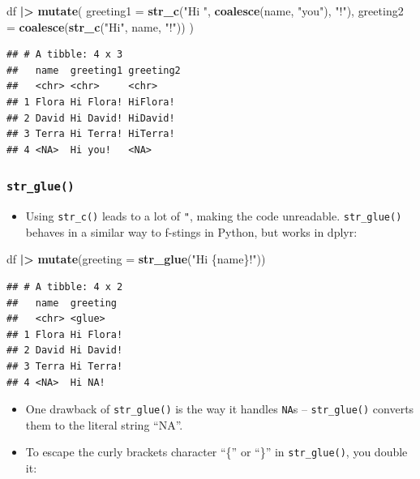 \documentclass[
]{article}
\newenvironment{Shaded}{\begin{snugshade}}{\end{snugshade}}
\newcommand{\AttributeTok}[1]{\textcolor[rgb]{0.13,0.29,0.53}{#1}}
\newcommand{\FunctionTok}[1]{\textcolor[rgb]{0.13,0.29,0.53}{\textbf{#1}}}
\newcommand{\NormalTok}[1]{#1}
\newcommand{\SpecialCharTok}[1]{\textcolor[rgb]{0.81,0.36,0.00}{\textbf{#1}}}
\newcommand{\StringTok}[1]{\textcolor[rgb]{0.31,0.60,0.02}{#1}}
\providecommand{\tightlist}{%
  \setlength{\itemsep}{0pt}\setlength{\parskip}{0pt}}
\begin{document}
\begin{Shaded}
\begin{Highlighting}[]
\NormalTok{df }\SpecialCharTok{|\textgreater{}} 
  \FunctionTok{mutate}\NormalTok{(}
    \AttributeTok{greeting1 =} \FunctionTok{str\_c}\NormalTok{(}\StringTok{"Hi "}\NormalTok{, }\FunctionTok{coalesce}\NormalTok{(name, }\StringTok{"you"}\NormalTok{), }\StringTok{"!"}\NormalTok{),}
    \AttributeTok{greeting2 =} \FunctionTok{coalesce}\NormalTok{(}\FunctionTok{str\_c}\NormalTok{(}\StringTok{"Hi"}\NormalTok{, name, }\StringTok{"!"}\NormalTok{))}
\NormalTok{  )}
\end{Highlighting}
\end{Shaded}

\begin{verbatim}
## # A tibble: 4 x 3
##   name  greeting1 greeting2
##   <chr> <chr>     <chr>    
## 1 Flora Hi Flora! HiFlora! 
## 2 David Hi David! HiDavid! 
## 3 Terra Hi Terra! HiTerra! 
## 4 <NA>  Hi you!   <NA>
\end{verbatim}

\subsubsection{\texorpdfstring{\texttt{str\_glue()}}{str\_glue()}}\label{str_glue}

\begin{itemize}
\tightlist
\item
  Using \texttt{str\_c()} leads to a lot of \texttt{"}, making the code
  unreadable. \texttt{str\_glue()} behaves in a similar way to f-stings
  in Python, but works in dplyr:
\end{itemize}

\begin{Shaded}
\begin{Highlighting}[]
\NormalTok{df }\SpecialCharTok{|\textgreater{}} 
  \FunctionTok{mutate}\NormalTok{(}\AttributeTok{greeting =} \FunctionTok{str\_glue}\NormalTok{(}\StringTok{"Hi \{name\}!"}\NormalTok{))}
\end{Highlighting}
\end{Shaded}

\begin{verbatim}
## # A tibble: 4 x 2
##   name  greeting 
##   <chr> <glue>   
## 1 Flora Hi Flora!
## 2 David Hi David!
## 3 Terra Hi Terra!
## 4 <NA>  Hi NA!
\end{verbatim}

\begin{itemize}
\item
  One drawback of \texttt{str\_glue()} is the way it handles
  \texttt{NA}s -- \texttt{str\_glue()} converts them to the literal
  string ``NA''.
\item
  To escape the curly brackets character ``\{'' or ``\}'' in
  \texttt{str\_glue()}, you double it:
\end{itemize}
\end{document}
